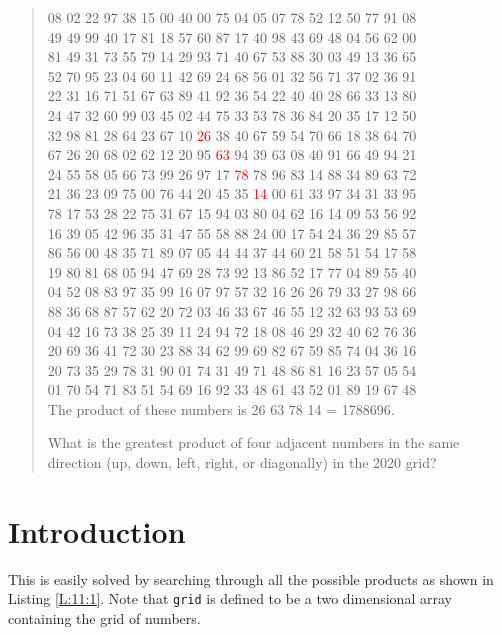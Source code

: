 \documentclass[oneside,12pt]{book}   	%
\newcounter{ex}
\newcounter{def}
\newcounter{pr}
\theoremstyle{definition}
\begin{document}
\begin{spacing}{1.618}
\begin{quote}
08 02 22 97 38 15 00 40 00 75 04 05 07 78 52 12 50 77 91 08 \\
49 49 99 40 17 81 18 57 60 87 17 40 98 43 69 48 04 56 62 00 \\
81 49 31 73 55 79 14 29 93 71 40 67 53 88 30 03 49 13 36 65 \\
52 70 95 23 04 60 11 42 69 24 68 56 01 32 56 71 37 02 36 91 \\
22 31 16 71 51 67 63 89 41 92 36 54 22 40 40 28 66 33 13 80 \\
24 47 32 60 99 03 45 02 44 75 33 53 78 36 84 20 35 17 12 50 \\
32 98 81 28 64 23 67 10 \textcolor{red}{26} 38 40 67 59 54 70 66 18 38 64 70 \\
67 26 20 68 02 62 12 20 95 \textcolor{red}{63} 94 39 63 08 40 91 66 49 94 21 \\
24 55 58 05 66 73 99 26 97 17 \textcolor{red}{78} 78 96 83 14 88 34 89 63 72 \\
21 36 23 09 75 00 76 44 20 45 35 \textcolor{red}{14} 00 61 33 97 34 31 33 95 \\
78 17 53 28 22 75 31 67 15 94 03 80 04 62 16 14 09 53 56 92 \\
16 39 05 42 96 35 31 47 55 58 88 24 00 17 54 24 36 29 85 57 \\
86 56 00 48 35 71 89 07 05 44 44 37 44 60 21 58 51 54 17 58 \\
19 80 81 68 05 94 47 69 28 73 92 13 86 52 17 77 04 89 55 40 \\
04 52 08 83 97 35 99 16 07 97 57 32 16 26 26 79 33 27 98 66 \\
88 36 68 87 57 62 20 72 03 46 33 67 46 55 12 32 63 93 53 69 \\
04 42 16 73 38 25 39 11 24 94 72 18 08 46 29 32 40 62 76 36 \\
20 69 36 41 72 30 23 88 34 62 99 69 82 67 59 85 74 04 36 16 \\
20 73 35 29 78 31 90 01 74 31 49 71 48 86 81 16 23 57 05 54 \\
01 70 54 71 83 51 54 69 16 92 33 48 61 43 52 01 89 19 67 48 \\
			The product of these numbers is 26  63  78  14 = 1788696.

			What is the greatest product of four adjacent numbers in the same direction (up, down, left, right, or diagonally) in the 2020 grid?
		\end{quote}
		
		\section{Introduction}
			This is easily solved by searching through all the possible products as shown in Listing \ref{L:11:1}. Note that \texttt{grid} is defined to be a two dimensional array containing the grid of numbers. 
			

\end{spacing}
\end{document}
